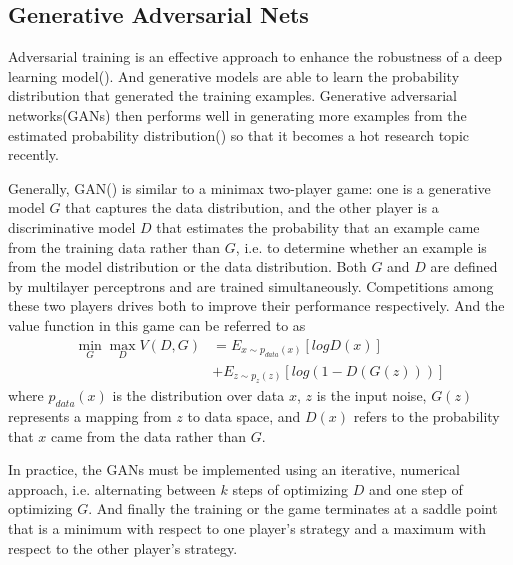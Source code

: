
\subsection{Generative Adversarial Nets}
Adversarial training is an effective approach to enhance the robustness of a deep learning model(\citealp{bai2021recent}). And generative models are able to learn the probability distribution that generated the training examples. Generative adversarial networks(GANs) then performs well in generating more examples from the estimated probability distribution(\citealp{goodfellow2020generative}) so that it becomes a hot research topic recently.

Generally, GAN(\citealp{10.5555/2969033.2969125}) is similar to a minimax two-player game: one is a generative model $G$ that captures the data distribution, and the other player is a discriminative model $D$ that estimates the probability that an example came from the training data rather than $G$, i.e. to determine whether an example is from the model distribution or the data distribution. Both $G$ and $D$ are defined by multilayer perceptrons and are trained simultaneously. Competitions among these two players drives both to improve their performance respectively. And the value function in this game can be referred to as
\begin{equation}
\begin{split}
\mathop{min}\limits_{G}\mathop{max}\limits_{D}V(D,G)&=E_{x\sim p_{data}(x)}[log D(x)]\\ &+E_{z\sim p_{z}(z)}[log (1-D(G(z)))]
\end{split}
\end{equation}
where $p_{data}(x)$ is the distribution over data $x$, $z$ is the input noise, $G(z)$ represents a mapping from $z$ to data space, and $D(x)$ refers to the probability that $x$ came from the data rather than $G$.

In practice, the GANs must be implemented using an iterative, numerical approach, i.e. alternating between $k$ steps of optimizing $D$ and one step of optimizing $G$. And finally the training or the game terminates at a saddle point that is a minimum with respect to one player's strategy and a maximum with respect to the other player's strategy.

